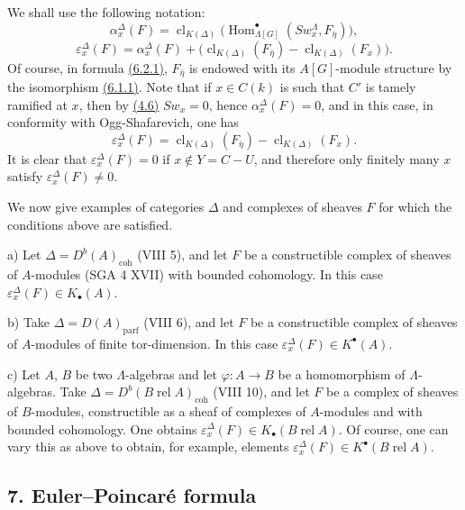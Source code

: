 \documentclass[11pt]{article}
\DeclareMathOperator{\Hom}{Hom}
\providecommand{\parf}{\mathrm{parf}}
\providecommand{\coh}{\mathrm{coh}}
\providecommand{\Hom}{\operatorname{Hom}}
\providecommand{\parf}{\mathrm{parf}}
\providecommand{\coh}{\mathrm{coh}}
\providecommand{\clK}[1]{\operatorname{cl}_{K(#1)}}
\providecommand{\Hom}{\operatorname{Hom}}
\begin{document}
We shall use the following notation:
\[
\alpha_x^\Delta(F)
=
\clK{\Delta}\bigl(\Hom^\bullet_{\Lambda[G]}(Sw_x^\Lambda,F_{\bar\eta})\bigr),
\tag{6.2.1}\label{sga5:X:equation:6.2.1}
\]
\[
\varepsilon_x^\Delta(F)
=
\alpha_x^\Delta(F)+
\bigl(\clK{\Delta}(F_{\bar\eta})-\clK{\Delta}(F_x)\bigr).
\tag{6.2.2}\label{sga5:X:equation:6.2.2}
\]
Of course, in formula \hyperref[sga5:X:equation:6.2.1]{(6.2.1)}, $F_{\bar\eta}$ is endowed with its $A[G]$-module structure by the isomorphism \hyperref[sga5:X:equation:6.1.1]{(6.1.1)}. Note that if $x\in C(k)$ is such that $C'$ is tamely ramified at $x$, then by \hyperref[sga5:X:remark:4.6]{(4.6)} $Sw_x=0$, hence $\alpha_x^\Delta(F)=0$, and in this case, in conformity with Ogg-Shafarevich, one has
\[
\varepsilon_x^\Delta(F)=\clK{\Delta}(F_{\bar\eta})-\clK{\Delta}(F_x).
\tag{6.2.3}\label{sga5:X:equation:6.2.3}
\]
It is clear that $\varepsilon_x^\Delta(F)=0$ if $x\notin Y=C-U$, and therefore only finitely many $x$ satisfy $\varepsilon_x^\Delta(F)\ne0$.

We now give examples of categories $\Delta$ and complexes of sheaves $F$ for which the conditions above are satisfied.

a) Let $\Delta=D^b(A)_{\coh}$ (VIII 5), and let $F$ be a constructible complex of sheaves of $A$-modules (SGA 4 XVII) with bounded cohomology. In this case $\varepsilon_x^\Delta(F)\in K_\bullet(A)$.

b) Take $\Delta=D(A)_{\parf}$ (VIII 6), and let $F$ be a constructible complex of sheaves of $A$-modules of finite tor-dimension. In this case $\varepsilon_x^\Delta(F)\in K^{\bullet}(A)$.

c) Let $A$, $B$ be two $\Lambda$-algebras and let $\varphi:A\to B$ be a homomorphism of $\Lambda$-algebras. Take $\Delta=D^b(B\operatorname{ rel }A)_{\coh}$ (VIII 10), and let $F$ be a complex of sheaves of $B$-modules, constructible as a sheaf of complexes of $A$-modules and with bounded cohomology. One obtains $\varepsilon_x^\Delta(F)\in K_\bullet(B\operatorname{ rel }A)$. Of course, one can vary this as above to obtain, for example, elements $\varepsilon_x^\Delta(F)\in K^{\bullet}(B\operatorname{ rel }A)$.

\subsection*{7. Euler--Poincaré formula}\label{sga5:X:subsection:7}
\end{document}
